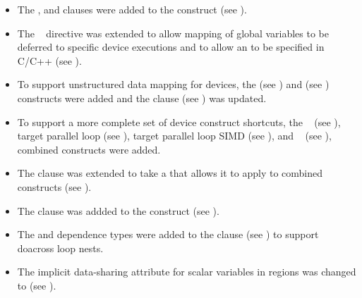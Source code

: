 \begin{itemize}
\item The ,  and  clauses 
      were added to the  construct (see ).

\item The ~ directive was extended to allow 
      mapping of global variables to be deferred to specific device 
      executions and to allow an 
      to be specified in C/C++ (see ).

\item To support unstructured data mapping for devices, the 
       (see ) and  (see ) constructs were added and the  clause 
      (see ) was updated.

\item To support a more complete set of device construct shortcuts, the
      ~ 
      (see ), 
      target parallel loop 
      (see ),
      target parallel loop SIMD 
      (see ),
      and ~ 
      (see ),
      combined constructs were added.

\item The  clause was extended to take a
       that allows it to apply
      to combined constructs (see ).

\item The  clause was addded to the  construct
      (see ).

\item The  and  dependence types were added to the 
       clause (see ) to support 
      doacross loop nests. 

\item The implicit data-sharing attribute for scalar variables in 
       regions was changed to  (see 
      ).
	 

\end{itemize}
